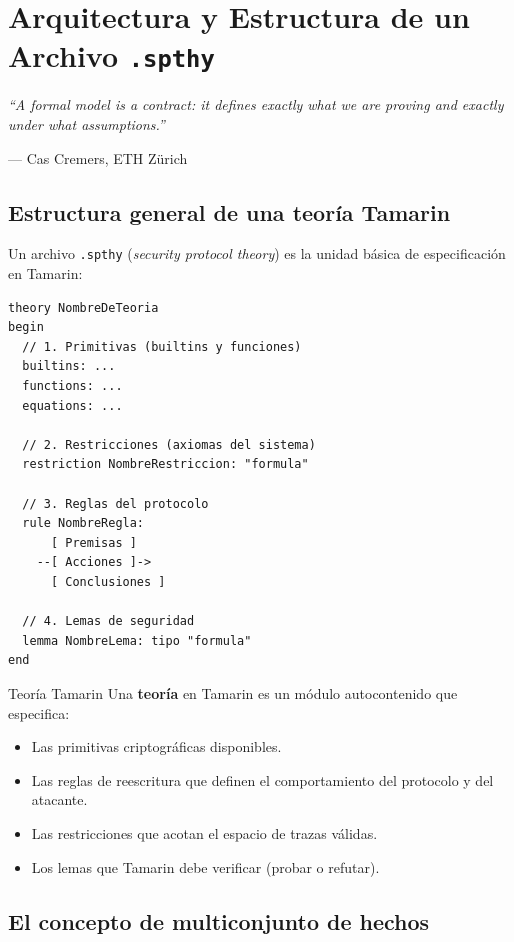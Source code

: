 \documentclass[12pt, a4paper, twoside, openright]{book}
\begin{document}
\chapter{Arquitectura y Estructura de un Archivo \texttt{.spthy}}

\epigraph{%
  \textit{``A formal model is a contract: it defines exactly what
  we are proving and exactly under what assumptions.''}
}{--- Cas Cremers, ETH Z\"urich}

\section{Estructura general de una teor\'ia Tamarin}

Un archivo \texttt{.spthy} (\textit{security protocol theory}) es
la unidad b\'asica de especificaci\'on en Tamarin:

\begin{lstlisting}[caption={Esqueleto de una teor\'ia Tamarin.}]
theory NombreDeTeoria
begin
  // 1. Primitivas (builtins y funciones)
  builtins: ...
  functions: ...
  equations: ...

  // 2. Restricciones (axiomas del sistema)
  restriction NombreRestriccion: "formula"

  // 3. Reglas del protocolo
  rule NombreRegla:
      [ Premisas ]
    --[ Acciones ]->
      [ Conclusiones ]

  // 4. Lemas de seguridad
  lemma NombreLema: tipo "formula"
end
\end{lstlisting}

\begin{cajaDef}{Teor\'ia Tamarin}
  Una \textbf{teor\'ia} en Tamarin es un m\'odulo autocontenido que
  especifica:
  \begin{itemize}[itemsep=2pt]
    \item Las primitivas criptogr\'aficas disponibles.
    \item Las reglas de reescritura que definen el comportamiento
      del protocolo y del atacante.
    \item Las restricciones que acotan el espacio de trazas v\'alidas.
    \item Los lemas que Tamarin debe verificar (probar o refutar).
  \end{itemize}
\end{cajaDef}

\section{El concepto de multiconjunto de hechos}
\end{document}
